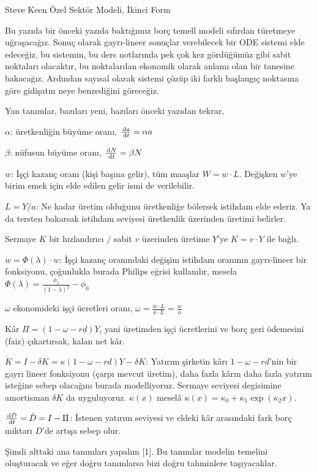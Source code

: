 \documentclass[12pt,fleqn]{article}\usepackage{../../common}
\begin{document}
Steve Keen Özel Sektör Modeli, İkinci Form

Bu yazıda bir önceki yazıda baktığımız borç temell modeli sıfırdan
türetmeye uğraşacağız. Sonuç olarak gayrı-lineer sonuçlar verebilecek bir
ODE sistemi elde edeceğiz, bu sistemin, bu ders notlarında pek çok kez
gördüğümüz gibi sabit noktaları olacaktır, bu noktalardan ekonomik olarak
anlamı olan bir tanesine bakacağız. Ardından sayısal olarak sistemi çözüp
iki farklı başlangıç noktasına göre gidişatın neye benzediğini göreceğiz.

Yan tanımlar, bazıları yeni, bazıları önceki yazıdan tekrar,

$\alpha$: üretkenliğin büyüme oranı, $\frac{\,\mathrm{d} a}{\,\mathrm{d} t} = \alpha a$

$\beta$: nüfusun büyüme oranı, $\frac{\,\mathrm{d} N}{\,\mathrm{d} t} = \beta N$

$w$: İşçi kazanç oranı (kişi başına gelir), tüm maaşlar $W = w \cdot
L$. Değişken $w$'ye birim emek için elde edilen gelir ismi de verilebilir.

$L = Y/a$: Ne kadar üretim olduğunu üretkenliğe bölersek istihdam elde
ederiz. Ya da tersten bakarsak istihdam seviyesi üretkenlik üzerinden
üretimi belirler.

Sermaye $K$ bir hızlandırıcı / sabit $v$ üzerinden üretime $Y$'ye
$K = v \cdot Y$ ile bağlı.

$\dot{w} = \Phi(\lambda) \cdot w$: İşçi kazanç oranındaki değişim istihdam
oranının gayrı-lineer bir fonksiyonu, çoğunlukla burada Philips eğrisi
kullanılır, mesela $\Phi(\lambda) = \frac{\phi_1}{(1-\lambda)^2}-\phi_0$

$\omega$ ekonomideki işçi ücretleri oranı, $\omega=\frac{w\cdot L}{a \cdot L} = \frac{w}{a}$

Kâr $\Pi = (1-\omega-rd)Y$, yani üretimden işçi ücretlerini ve borç geri
ödemesini (faiz) çıkartırsak, kalan net kâr. 

$\dot{K} = I - \delta K =\kappa(1 - \omega - rd) Y - \delta K$: Yatırım
şirketin kârı $1 - \omega - rd$'nin bir gayrı lineer fonksiyonu (çarpı
mevcut üretim), daha fazla kârın daha fazla yatırım isteğine sebep
olacağını burada modelliyoruz. Sermaye seviyesi degisimine amortisman
$\delta K$ da uyguluyoruz. $\kappa(x)$ meselâ
$\kappa(x) = \kappa_0 + \kappa_1 \exp(\kappa_2 x)$.

$ \frac{\,\mathrm{d} D}{\,\mathrm{d} t} = \dot{D} = I - \Pi$: İstenen yatırım seviyesi ve
eldeki kâr arasındaki fark borç miktarı $D$'de artışa sebep olur.

Şimdi alttaki ana tanımları yapalım [1]. Bu tanımlar modelin temelini
oluşturacak ve eğer doğru tanımlarsa bizi doğru tahminlere taşıyacaklar.
\end{document}
